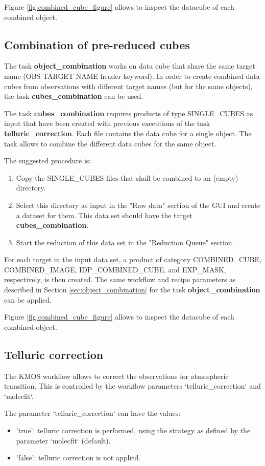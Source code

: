 Figure \ref{fig:combined_cube_figure} allows to inspect the datacube of
each combined object.


\subsection{Combination of pre-reduced cubes}
The task {\bf object\_combination} works on data cube that share the same target name (OBS TARGET NAME header keyword).
In order to create combined data cubes from observations with different target names (but for the same objects), the task
{\bf cubes\_combination} can be used.

The task {\bf cubes\_combination} requires products of type SINGLE\_CUBES as input that have been created with
previous executions of the task {\bf telluric\_correction}. Each file contains the data cube for a single object. 
The task allows to combine the different data cubes for the same object. 

The suggested procedure is:
\begin{enumerate}
\item Copy the SINGLE\_CUBES files that shall be combined to an (empty) directory.
\item Select this directory as input in the "Raw data" section of the GUI and create a dataset for them. This data set should have the target {\bf cubes\_combination}.
\item Start the reduction of this data set in the "Reduction Queue" section.
\end{enumerate}
For each target in the input data set, a product of category COMBINED\_CUBE, COMBINED\_IMAGE, 
IDP\_COMBINED\_CUBE, and EXP\_MASK, respectively, is then created.
The same workflow and recipe parameters as described in Section \ref{sec:object_combination} for the task {\bf object\_combination} can be applied.

Figure \ref{fig:combined_cube_figure} allows to inspect the datacube of
each combined object.


\subsection{Telluric correction}
\label{sec:telluric_correction}

The KMOS workflow allows to correct the observations for atmospheric transition. This is controlled by the
workflow parameters `telluric\_correction` and `molecfit`.

The parameter `telluric\_correction` can have the values:
\begin{itemize}
\item 'true': telluric correction is performed, using the strategy as defined by the parameter `molecfit` (default).
\item 'false': telluric correction is not applied.
\end{itemize}

